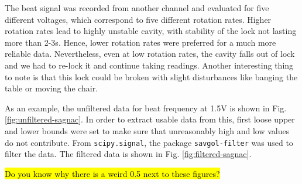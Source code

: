 \documentclass[a4paper]{report}
\numberwithin{equation}{section}
\begin{document}
The beat signal was recorded from another channel and evaluated for five different voltages, which correspond to five different rotation rates. Higher rotation rates lead to highly unstable cavity, with stability of the lock not lasting more than 2-3s. Hence, lower rotation rates were preferred for a much more reliable data. Nevertheless, even at low rotation rates, the cavity falls out of lock and we had to re-lock it and continue taking readings. Another interesting thing to note is that this lock could be broken with slight disturbances like banging the table or moving the chair. 

As an example, the unfiltered data for beat frequency at 1.5V is shown in Fig. \ref{fig:unfiltered-sagnac}. In order to extract usable data from this, first loose upper and lower bounds were set to make sure that unreasonably high and low values do not contribute. From \texttt{scipy.signal}, the package \texttt{savgol-filter} was used to filter the data. The filtered data is shown in Fig. \ref{fig:filtered-sagnac}. 

\hl{Do you know why there is a weird 0.5 next to these figures?}


\end{document}
